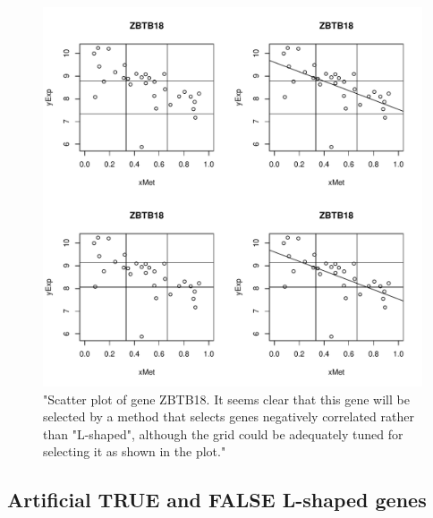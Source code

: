 \documentclass[a4paper,10pt]{article}\usepackage[]{graphicx}\usepackage[]{color}
\makeatletter
\def\maxwidth{ %
  \ifdim\Gin@nat@width>\linewidth
    \linewidth
  \else
    \Gin@nat@width
  \fi
}
\newenvironment{knitrout}{}{} %
\makeatother
\begin{document}
\begin{figure}
\begin{knitrout}
\color{fgcolor}
\includegraphics[width=\maxwidth]{figure/plotZBTB18-1} 

\end{knitrout}
\caption{"Scatter plot of gene ZBTB18. It seems clear that this gene will be selected by a method that selects genes negatively correlated rather than "L-shaped", although the grid could be adequately tuned for selecting it as shown in the plot."\label{plotZBTB18}}
\end{figure}



\subsection{Artificial TRUE and FALSE L-shaped genes}
\end{document}
